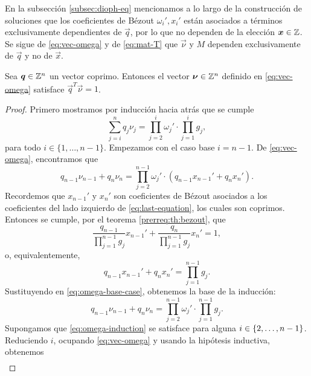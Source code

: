 En la subsección \ref{subsec:dioph-eq} mencionamos a lo largo de la construcción de soluciones que
los coeficientes de Bézout $\omega_i', x_i'$ están asociados a términos exclusivamente dependientes
de $\vec{q}$, por lo que no dependen de la elección $\boldsymbol{x} \in \mathbb{Z}$. Se sigue de
\eqref{eq:vec-omega} y de \eqref{eq:mat-T} que $\vec{\nu}$ y $M$ dependen exclusivamente de
$\vec{q}$ y no de $\vec{x}$.

\begin{lemma} \label{lemma:iso1}
	Sea $\boldsymbol{q} \in \mathbb{Z}^{n}$ un vector coprimo. Entonces el vector $\boldsymbol{\nu}
	\in \mathbb{Z}^n$ definido en \eqref{eq:vec-omega} satisface $\vec{q}^T\vec{\nu} =
	1$.
\end{lemma}
\begin{proof}
	Primero mostramos por inducción hacia atrás que se cumple
	\begin{equation}
		\label{eq:omega-induction} \sum_{j=i}^{n}q_j\nu_j =
		\prod_{j=2}^{i}\omega_j' \cdot \prod_{j=1}^{i}g_j,
	\end{equation}
	para todo $i \in \lbrace 1, \ldots, n - 1\rbrace$. Empezamos con el caso base $i = n - 1$. De
	\eqref{eq:vec-omega}, encontramos que
	\begin{equation}
		\label{eq:omega-base-case}
		q_{n-1}\nu_{n-1} + q_n\nu_n =
		\prod_{j=2}^{n-1}\omega_j' \cdot \left(q_{n-1}x_{n-1}' + q_nx_n'\right).
	\end{equation}
	Recordemos que $x_{n-1}'$ y $x_n'$ son coeficientes de Bézout asociados a los coeficientes del
	lado izquierdo de \eqref{eq:last-equation}, los cuales son coprimos. Entonces se cumple, por el
	teorema \ref{prerreq:th:bezout}, que
	\begin{equation*}
		\frac{q_{n-1}}{\prod_{j=1}^{n-1}g_j}x_{n-1}' +
		\frac{q_n}{\prod_{j=1}^{n-1}g_j}x_n' = 1,
	\end{equation*}
	o, equivalentemente,
	\begin{equation*}
		q_{n-1}x_{n-1}' + q_nx_n' = \prod_{j=1}^{n-1}g_j.
	\end{equation*}
	Sustituyendo en \eqref{eq:omega-base-case}, obtenemos la base de la inducción:
	\begin{equation*}
		q_{n-1}\nu_{n-1} + q_n\nu_n  =
		\prod_{j=2}^{n-1}\omega_j' \cdot \prod_{j=1}^{n-1}g_j.
	\end{equation*}
	Supongamos que \eqref{eq:omega-induction} se satisface para alguna $i \in \lbrace 2, \ldots, n -
	1 \rbrace$. Reduciendo $i$, ocupando \eqref{eq:vec-omega} y usando la hipótesis inductiva,
	obtenemos
	\begin{align*}

\end{align*}
\end{proof}
